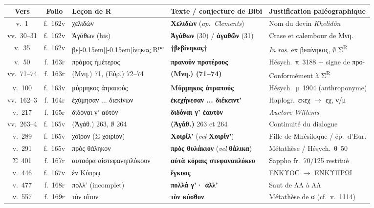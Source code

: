 \documentclass[10pt, a4paper, twoside]{book}
\renewcommand{\_}{\origunderscore\penalty0\relax}
\renewcommand{\texttt}[1]{#1}
\providecommand{\italique}[1]{\emph{#1}}
\providecommand{\lecon}[1]{\textbf{#1}}
\providecommand{\expo}[1]{\textsuperscript{#1}}
\providecommand{\Rpc}{R\expo{pc}}
\providecommand{\inRas}[2]{[\kern-0.15em[\text{#1}]\kern-0.15em]\text{#2}}
\begin{document}
\begin{small}
\begin{longtable}{c c p{3.3cm} p{4.0cm} p{3.8cm}}
\toprule
\textbf{Vers} & \textbf{Folio} & \textbf{Leçon de R} & \textbf{Texte / conjecture de Bibi} & \textbf{Justification paléographique} \\
\midrule
\endhead
\bottomrule
\endfoot
v.~1 & \texttt{f.~162v} & χελιδὼν & \lecon{Χελιδὼν} (\italique{ap.~Clements}) & Nom du devin \italique{Khelidôn} \\
vv.~30--31 & \texttt{f.~162v} & Ἀγάθων (bis) & \lecon{Ἁγάθων} (30) / \lecon{ἀγαθῶν} (31) & Crase et calembour de \texttt{Μνη.} \\
v.~35 & \texttt{f.~162v} & βε\inRas{α}{β}ίνηκας \Rpc{} & \lecon{†βεβίνηκας†} & \italique{In ras.} ex βεαίνηκας, $\emptyset$ Σ\textsuperscript{R} \\
v.~50 & \texttt{f.~163r} & πράμος ἡμέτερος & \lecon{πρανοῦν προτέρους} & Hésych.~π~3188 + signe de προ- \\
vv.~71--74 & \texttt{f.~163r} & (Μνη.) 71, (Εὐρ.) 72--74 & \lecon{(Μνη.) (71--74)} & Conformément à Σ\textsuperscript{R} \\
v.~100 & \texttt{f.~163v} & μύρμηκος ἀτραπούς & \lecon{Μύρμηκος ἀτραπούς} & Hésych.~μ~1904 (anthroponyme) \\
vv.~162--3 & \texttt{f.~164r} & ἐχύμησαν ... διεκίνων & \lecon{ἐκεχήνεσαν ... διέκειντ'} & Haplogr.~εκεχ $\to$ εχ, ν/μ \\
v.~217 & \texttt{f.~165r} & διδόναι γ' αὐτὸν & \lecon{διδόναι γ' ἑαυτὸν} & \italique{Auctore Willems} \\
vv.~263--4 & \texttt{f.~165v} & (Ἀγάθ.) 263, $\emptyset$ 264 & \lecon{(Ἀγάθ.)} 263 et 264 & Continuité du dialogue \\
v.~289 & \texttt{f.~165v} & χοῖρον (Σ χοιρίον) & \lecon{Χοιρίλ'} (\italique{vel} \lecon{Χοιρίν'}) & Fille de Mnésiloque / ép.~d'Eur. \\
v.~291 & \texttt{f.~165v} & πρὸς θάληκον & \lecon{πρὸς θυλάκιον} (\italique{vel} \lecon{θάλικα}) & Métathèse / Hésych.~θ~50 \\
Σ~401 & \texttt{f.~167r} & αυταόρα αἱστεφανηπλόκουν & \lecon{αὐτὰ κόραις στεφαναπλόκεο} & Sappho fr.~70/125 restitué \\
v.~446 & \texttt{f.~167v} & ἐν Κύπρῳ & \lecon{ἔγκυος} & ΕΝΚΥΟϹ $\to$ ΕΝΚΥΠΡΩΙ \\
v.~477 & \texttt{f.~168r} & πολλ' (incomplet) & \lecon{πολλά γ'· ἀλλ'} & Saut de ΛΛ à ΛΛ \\
v.~557 & \texttt{f.~169r} & τὸν σῖτον & \lecon{τὸν κύσθον} & Métathèse de σ (cf.~v.~1114) \\

\end{longtable}
\end{small}
\end{document}
